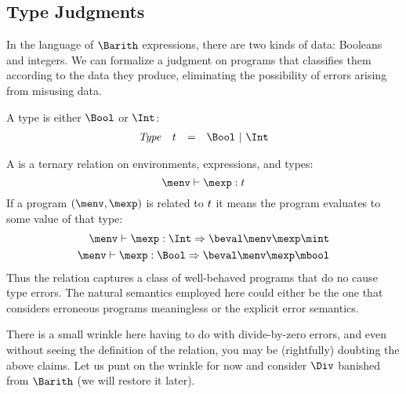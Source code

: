 \subsection{Type Judgments}\label{sec:type-judgments}

In the language of $\Barith$ expressions, there are two kinds of data:
Booleans and integers.  We can formalize a judgment on programs that
classifies them according to the data they produce, eliminating the
possibility of errors arising from misusing data.

A type is either $\Bool$ or $\Int$:
\[
\begin{array}{llcl}
\mathit{Type} & \mtype & = & \Bool\ |\ \Int
\end{array}
\]

A  is a ternary relation on environments,
expressions, and types:
\[
\typevaljudge\menv\mexp\mtype
\]
If a program $(\menv,\mexp)$ is related to $t$ it means the
program evaluates to some value of that type:
\begin{align*}
\typevaljudge\menv\mexp\Int \Rightarrow \beval\menv\mexp\mint\\
\typevaljudge\menv\mexp\Bool \Rightarrow \beval\menv\mexp\mbool
\end{align*}
Thus the relation captures a class of well-behaved programs that do no
cause type errors.  The natural semantics employed here could either
be the one that considers erroneous programs meaningless or the
explicit error semantics.

There is a small wrinkle here having to do with divide-by-zero errors,
and even without seeing the definition of the relation, you may be
(rightfully) doubting the above claims.  Let us punt on the wrinkle
for now and consider $\Div$ banished from $\Barith$ (we will restore
it later).

